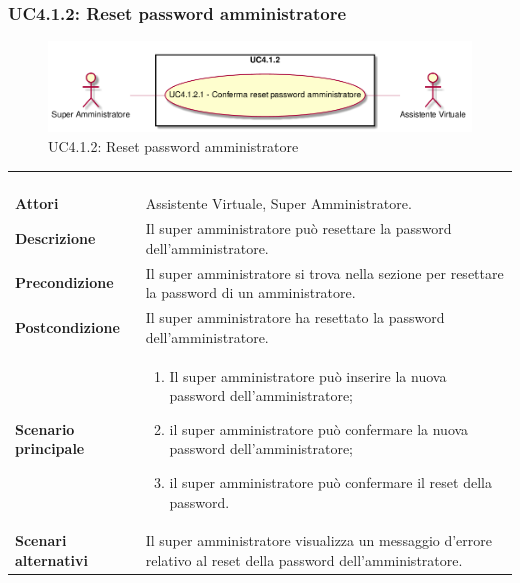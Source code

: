 \newpage\subsubsection{UC4.1.2: Reset password amministratore}
\label{UC4.1.2}
\begin{figure}[h]
	\centering
	\includegraphics[width=\textwidth,height=\textheight,keepaspectratio]{images/UseCaseUC412.png}
	\caption{UC4.1.2: Reset password amministratore}
\end{figure}
\begin{longtable}{l|p{10cm}}
	\rowcolor[gray]{0.8} \multicolumn{2}{c}{} \\
	\rowcolor[gray]{0.8} \multicolumn{2}{c}{\textbf{UC4.1.2 - Reset password amministratore}} \\
	\rowcolor[gray]{0.8} \multicolumn{2}{c}{} \\
	\hline
	&\\
	\textbf{Attori} & Assistente Virtuale, Super Amministratore.\\[7pt]
	\textbf{Descrizione} & Il super amministratore può resettare la password dell'amministratore.\\[7pt]
	\textbf{Precondizione} & Il super amministratore si trova nella sezione per resettare la password di un amministratore.\\[7pt]
	\textbf{Postcondizione} & Il super amministratore ha resettato la password dell'amministratore.\\[7pt]
	\textbf{Scenario principale} &\begin{enumerate}
		\item  Il super amministratore può inserire la nuova password dell'amministratore;
		\item  il super amministratore può confermare la nuova password dell'amministratore;
		\item  il super amministratore può confermare il reset della password.
	\end{enumerate}
	\\[7pt]
	\textbf{Scenari alternativi} & Il super amministratore visualizza un messaggio d'errore relativo al reset della password dell'amministratore.\\[7pt]\hline
\end{longtable}

